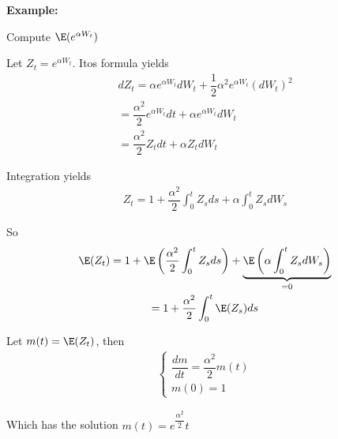 \par\bigskip
\noindent\textbf{Example:}\par
\noindent Compute $\E(e^{{\alpha W_t}})$\par
\noindent Let $Z_t = e^{\alpha W_t}$. Itos formula yields
\begin{equation*}
  \begin{gathered}
    dZ_t = \alpha e^{\alpha W_t}dW_t + \dfrac{1}{2}\alpha^2e^{\alpha W_t}(dW_t)^2\\
    = \dfrac{\alpha^2}{2}e^{\alpha W_t}dt + \alpha e^{\alpha W_t}dW_t\\
    = \dfrac{\alpha^2}{2}Z_tdt+\alpha Z_tdW_t
  \end{gathered}
\end{equation*}\par
\noindent Integration yields
\begin{equation*}
  \begin{gathered}
    Z_t = 1+\dfrac{\alpha^2}{2}\int_{0}^{t}Z_sds + \alpha\int_{0}^{t}Z_sdW_s
  \end{gathered}
\end{equation*}\par
\noindent So
\begin{equation*}
  \begin{gathered}
    \E(Z_t) = 1+\E\left(\dfrac{\alpha^2}{2}\int_{0}^{t}Z_sds\right) + \underbrace{\E\left(\alpha\int_{0}^{t}Z_sdW_s\right)}_{=0}\\
    = 1+ \dfrac{\alpha^2}{2}\int_{0}^{t}\E(Z_s)ds
  \end{gathered}
\end{equation*}\par
\noindent Let $m(t) = \E(Z_t)$, then
\begin{equation*}
  \begin{gathered}
    \begin{cases}
      \dfrac{dm}{dt} = \dfrac{\alpha^2}{2}m(t)\\
      m(0) = 1
    \end{cases}
  \end{gathered}
\end{equation*}\par
\noindent Which has the solution $m(t) = e^{\dfrac{\alpha^2}{2}}t$
\par\bigskip
